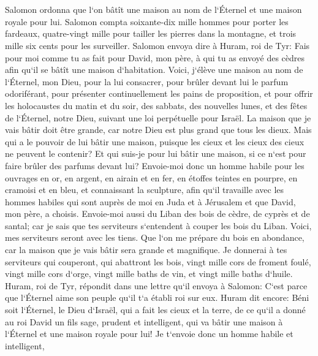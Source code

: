 \chapter{}

\verse Salomon ordonna que l`on bâtît une maison au nom de l`Éternel et une maison royale pour lui. 
\verse Salomon compta soixante-dix mille hommes pour porter les fardeaux, quatre-vingt mille pour tailler les pierres dans la montagne, et trois mille six cents pour les surveiller. 
\verse Salomon envoya dire à Huram, roi de Tyr: Fais pour moi comme tu as fait pour David, mon père, à qui tu as envoyé des cèdres afin qu`il se bâtît une maison d`habitation. 
\verse Voici, j`élève une maison au nom de l`Éternel, mon Dieu, pour la lui consacrer, pour brûler devant lui le parfum odoriférant, pour présenter continuellement les pains de proposition, et pour offrir les holocaustes du matin et du soir, des sabbats, des nouvelles lunes, et des fêtes de l`Éternel, notre Dieu, suivant une loi perpétuelle pour Israël. 
\verse La maison que je vais bâtir doit être grande, car notre Dieu est plus grand que tous les dieux. 
\verse Mais qui a le pouvoir de lui bâtir une maison, puisque les cieux et les cieux des cieux ne peuvent le contenir? Et qui suis-je pour lui bâtir une maison, si ce n`est pour faire brûler des parfums devant lui? 
\verse Envoie-moi donc un homme habile pour les ouvrages en or, en argent, en airain et en fer, en étoffes teintes en pourpre, en cramoisi et en bleu, et connaissant la sculpture, afin qu`il travaille avec les hommes habiles qui sont auprès de moi en Juda et à Jérusalem et que David, mon père, a choisis. 
\verse Envoie-moi aussi du Liban des bois de cèdre, de cyprès et de santal; car je sais que tes serviteurs s`entendent à couper les bois du Liban. Voici, mes serviteurs seront avec les tiens. 
\verse Que l`on me prépare du bois en abondance, car la maison que je vais bâtir sera grande et magnifique. 
\verse Je donnerai à tes serviteurs qui couperont, qui abattront les bois, vingt mille cors de froment foulé, vingt mille cors d`orge, vingt mille baths de vin, et vingt mille baths d`huile. 
\verse Huram, roi de Tyr, répondit dans une lettre qu`il envoya à Salomon: C`est parce que l`Éternel aime son peuple qu`il t`a établi roi sur eux. 
\verse Huram dit encore: Béni soit l`Éternel, le Dieu d`Israël, qui a fait les cieux et la terre, de ce qu`il a donné au roi David un fils sage, prudent et intelligent, qui va bâtir une maison à l`Éternel et une maison royale pour lui! 
\verse Je t`envoie donc un homme habile et intelligent, 
